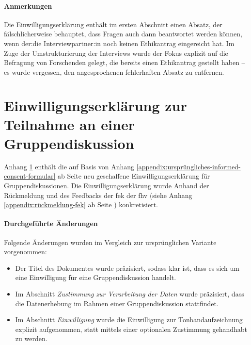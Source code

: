 \documentclass[a4paper,12pt,twoside]{scrreprt}
\begin{document}
\subsubsection*{Anmerkungen}
\label{appendix:anmerkungen-informed-consent-einzelinterview}

Die Einwilligungserklärung enthält im ersten Abschnitt einen Absatz, der fälschlicherweise behauptet, dass Fragen auch dann beantwortet werden können, wenn der:die Interviewpartner:in noch keinen Ethikantrag eingereicht hat. Im Zuge der Umstrukturierung der Interviews wurde der Fokus explizit auf die Befragung von Forschenden gelegt, die bereits einen Ethikantrag gestellt haben -- es wurde vergessen, den angesprochenen fehlerhaften Absatz zu entfernen.



\cleardoublepage
\chapter{Einwilligungserklärung zur Teilnahme an einer Gruppendiskussion}
\label{appendix:informed-consent-gruppendiskussion}

Anhang \ref{appendix:informed-consent-gruppendiskussion} enthält die auf Basis von Anhang \ref{appendix:ursprüngliches-informed-consent-formular} ab Seite \pageref{appendix:ursprüngliches-informed-consent-formular} neu geschaffene Einwilligungserklärung für Gruppendiskussionen. Die Einwilligungserklärung wurde Anhand der Rückmeldung und des Feedbacks der \acl{fek} der \acl{fhv} (siehe Anhang \ref{appendix:rückmeldung-fek} ab Seite \pageref{appendix:rückmeldung-fek}) konkretisiert.

\subsubsection*{Durchgeführte Änderungen}
\label{appendix:änderungen-informed-consent-gruppendiskussion}

Folgende Änderungen wurden im Vergleich zur ursprünglichen Variante vorgenommen:
\begin{itemize}
    \item Der Titel des Dokumentes wurde präzisiert, sodass klar ist, dass es sich um eine Einwilligung für eine Gruppendiskussion handelt.
    \item Im Abschnitt \textit{Zustimmung zur Verarbeitung der Daten} wurde präzisiert, dass die Datenerhebung im Rahmen einer Gruppendiskussion stattfindet.
    \item Im Abschnitt \textit{Einwilligung} wurde die Einwilligung zur Tonbandaufzeichnung explizit aufgenommen, statt mittels einer optionalen Zustimmung gehandhabt zu werden.
\end{itemize}
\end{document}

